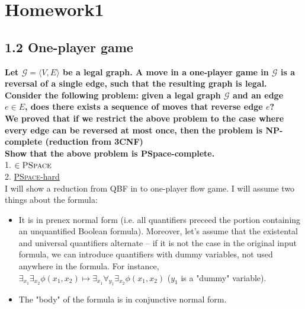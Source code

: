 \section{Homework1}
\subsection*{1.2 One-player game}
\textbf{Let $\mathcal{G} = \langle V, E \rangle$ be a legal graph. A move in a one-player game in $\mathcal{G}$
is a reversal of a single edge, such that the resulting graph is legal.\\
Consider the following problem: given a legal graph $\mathcal{G}$ and an edge $e \in E$, does there exists
a sequence of moves that reverse edge $e$?\\
We proved that if we restrict the above problem to the case where every edge
can be reversed at most once, then the problem is NP-complete (reduction
from 3CNF)\\
Show that the above problem is PSpace-complete.}\\
1. \underline{$\in \textsc{PSpace}$}\\
2. \underline{\textsc{PSpace}-hard}\\
I will show a reduction from QBF in to one-player flow game. I will assume two
things about the formula:
\begin{itemize}
      \item It is in prenex normal form (i.e. all quantifiers preceed the portion
      containing an unquantified Boolean formula). Moreover, let's assume that the
      existental and universal quantifiers alternate -- if it is not the case in the
      original input formula, we can introduce quantifiers with dummy variables, not
      used anywhere in the formula. For instance, $\exists_{x_1} \exists_{x_2}
      \phi(x_1, x_2) \mapsto \exists_{x_1} \forall_{y_1} \exists_{x_2} \phi(x_1, x_2)$
      ($y_1$ is a "dummy" variable).
      \item The "body" of the formula is in conjunctive normal form.
\end{itemize}


